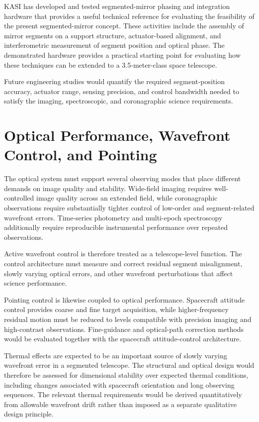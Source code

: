 KASI has developed and tested segmented-mirror phasing and integration
hardware that provides a useful technical reference for evaluating the
feasibility of the present segmented-mirror concept. 
These activities include the assembly of mirror segments on a
support structure, actuator-based alignment, and interferometric
measurement of segment position and optical phase. The demonstrated
hardware provides a practical starting point for evaluating how these
techniques can be extended to a 3.5-meter-class space telescope.

Future engineering studies would quantify the required segment-position
accuracy, actuator range, sensing precision, and control bandwidth needed
to satisfy the imaging, spectroscopic, and coronagraphic science
requirements.


\section{Optical Performance, Wavefront Control, and Pointing}

The optical system must support several observing modes that place different
demands on image quality and stability. Wide-field imaging requires
well-controlled image quality across an extended field, while
coronagraphic observations require substantially tighter control of
low-order and segment-related wavefront errors. Time-series photometry and
multi-epoch spectroscopy additionally require reproducible instrumental
performance over repeated observations.

Active wavefront control is therefore treated as a telescope-level
function. The control architecture must measure and correct residual
segment misalignment, slowly varying optical errors, and other
wavefront perturbations that affect science performance. 

Pointing control is likewise coupled to optical performance. Spacecraft
attitude control provides coarse and fine target acquisition, while
higher-frequency residual motion must be reduced to levels compatible with
precision imaging and high-contrast observations. Fine-guidance and
optical-path correction methods would be evaluated together with the
spacecraft attitude-control architecture.

Thermal effects are expected to be an important source of slowly varying
wavefront error in a segmented telescope. The structural and optical design
would therefore be assessed for dimensional stability over expected thermal
conditions, including changes associated with spacecraft orientation and
long observing sequences. The relevant thermal requirements would be
derived quantitatively from allowable wavefront drift rather than imposed
as a separate qualitative design principle.


